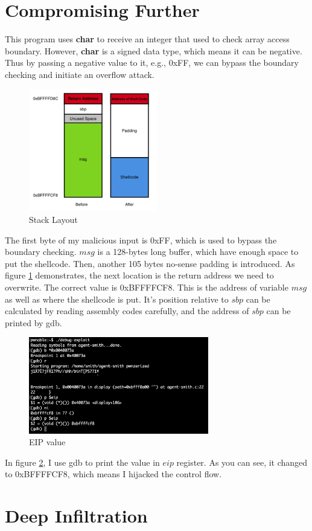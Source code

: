 \documentclass{article}
\begin{document}
\newpage
\section{Compromising Further}

This program uses \textbf{char} to receive an integer that used to check array access boundary. However, \textbf{char}
 is a signed data type, which means it can be negative. Thus by passing a negative value to it, e.g., 0xFF, we can bypass the boundary checking and initiate an overflow attack.
 
 \begin{figure}[h]
\centering
\includegraphics[width=0.5\textwidth]{stack2.png}
\caption{\label{fig:stack2}Stack Layout}
\end{figure}

The first byte of my malicious input is 0xFF, which is used to bypass the boundary checking. $msg$ is a 128-bytes long buffer, which have enough space to put the shellcode. Then, another 105 bytes no-sense padding is introduced. As figure \ref{fig:stack2} demonstrates, the next location is the return address we need to overwrite. The correct value is 0xBFFFFCF8. This is the address of variable $msg$ as well as where the shellcode is put. It's position relative to $sbp$ can be calculated by reading assembly codes carefully, and the address of $sbp$ can be printed by gdb.

\begin{figure}[h]
\centering
\includegraphics[width=0.7\textwidth]{gdb2.png}
\caption{\label{fig:gdb2}EIP value}
\end{figure}

In figure \ref{fig:gdb2}, I use gdb to print the value in $eip$ register. As you can see, it changed to 0xBFFFFCF8, which means I hijacked the control flow.

\newpage
\section{Deep Infiltration}
\end{document}
